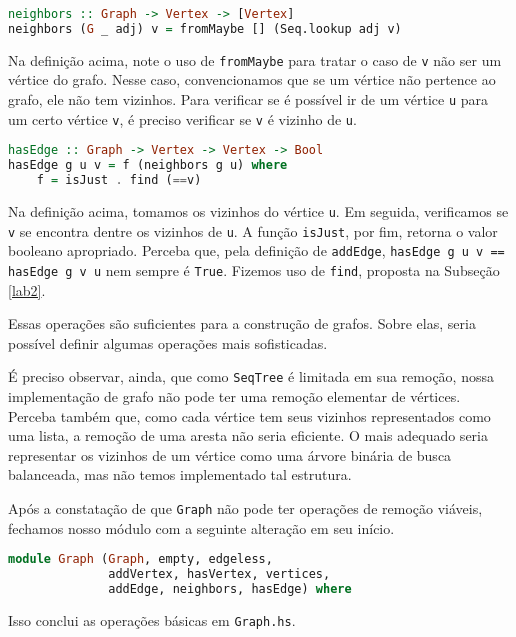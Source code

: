 \documentclass[a4paper]{article}
\begin{document}
\begin{lstlisting}[language=haskell, frame=single]
neighbors :: Graph -> Vertex -> [Vertex]
neighbors (G _ adj) v = fromMaybe [] (Seq.lookup adj v)
\end{lstlisting}

Na definição acima, note o uso de \texttt{fromMaybe} para tratar o caso de \texttt{v} não ser um vértice do grafo.
Nesse caso, convencionamos que se um vértice não pertence ao grafo, ele não tem vizinhos.
Para verificar se é possível ir de um vértice \texttt{u} para um certo vértice \texttt{v}, é preciso verificar se \texttt{v} é vizinho de \texttt{u}.

\begin{lstlisting}[language=haskell, frame=single]
hasEdge :: Graph -> Vertex -> Vertex -> Bool
hasEdge g u v = f (neighbors g u) where
	f = isJust . find (==v)
\end{lstlisting}

Na definição acima, tomamos os vizinhos do vértice \texttt{u}.
Em seguida, verificamos se \texttt{v} se encontra dentre os vizinhos de \texttt{u}.
A função \texttt{isJust}, por fim, retorna o valor booleano apropriado.
Perceba que, pela definição de \texttt{addEdge}, \mbox{\texttt{hasEdge g u v == hasEdge g v u}} nem sempre é \texttt{True}.
Fizemos uso de \texttt{find}, proposta na Subseção \ref{lab2}.

Essas operações são suficientes para a construção de grafos.
Sobre elas, seria possível definir algumas operações mais sofisticadas.

É preciso observar, ainda, que como \texttt{SeqTree} é limitada em sua remoção, nossa implementação de grafo não pode ter uma remoção elementar de vértices.
Perceba também que, como cada vértice tem seus vizinhos representados como uma lista, a remoção de uma aresta não seria eficiente.
O mais adequado seria representar os vizinhos de um vértice como uma árvore binária de busca balanceada, mas não temos implementado tal estrutura.

Após a constatação de que \texttt{Graph} não pode ter operações de remoção viáveis, fechamos nosso módulo com a seguinte alteração em seu início.

\begin{lstlisting}[language=haskell, frame=single]
module Graph (Graph, empty, edgeless,
              addVertex, hasVertex, vertices,
              addEdge, neighbors, hasEdge) where
\end{lstlisting}

Isso conclui as operações básicas em \texttt{Graph.hs}.
\end{document}
